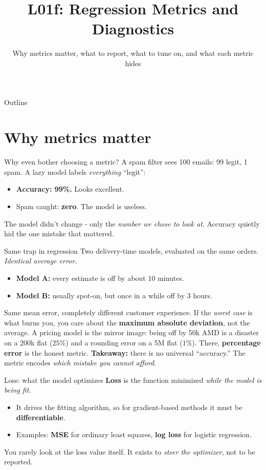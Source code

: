 \documentclass[aspectratio=169]{beamer}
\title{L01f: Regression Metrics and Diagnostics}
\subtitle{Why metrics matter, what to report, what to tune on, and what each metric hides}
\date{}
\begin{document}
\begin{frame}{Outline}
  \tableofcontents
\end{frame}

\section{Why metrics matter}

\begin{frame}{Why even bother choosing a metric?}
  A spam filter sees 100 emails: 99 legit, 1 spam.
  \vfill
  A lazy model labels \emph{everything} ``legit'':
  \begin{itemize}
    \item \textbf{Accuracy: 99\%.} Looks excellent.
    \item Spam caught: \textbf{zero}. The model is useless.
  \end{itemize}
  \vfill
  The model didn't change - only the \emph{number we chose to look at}. Accuracy quietly hid the one mistake that mattered.
  \vfill
\end{frame}

\begin{frame}{Same trap in regression}
  Two delivery-time models, evaluated on the same orders. \emph{Identical average error.}
  \vfill
  \begin{itemize}
    \item \textbf{Model A:} every estimate is off by about 10 minutes.
    \item \textbf{Model B:} usually spot-on, but once in a while off by 3 hours.
  \end{itemize}
  \vfill
  Same mean error, completely different customer experience. If the \emph{worst case} is what burns you, you care about the \textbf{maximum absolute deviation}, not the average.
  \vfill
  A pricing model is the mirror image: being off by 50k AMD is a disaster on a 200k flat ($25\%$) and a rounding error on a 5M flat ($1\%$). There, \textbf{percentage error} is the honest metric.
  \vfill
  \footnotesize \textbf{Takeaway:} there is no universal ``accuracy.'' The metric encodes \emph{which mistake you cannot afford}.
\end{frame}

\begin{frame}{Loss: what the model optimizes}
  \textbf{Loss} is the function minimized \emph{while the model is being fit}.
  \vfill
  \begin{itemize}
    \item It drives the fitting algorithm, so for gradient-based methods it must be \textbf{differentiable}.
    \item Examples: \textbf{MSE} for ordinary least squares, \textbf{log loss} for logistic regression.
  \end{itemize}
  \vfill
  You rarely look at the loss value itself. It exists to \emph{steer the optimizer}, not to be reported.
\end{frame}
\end{document}
